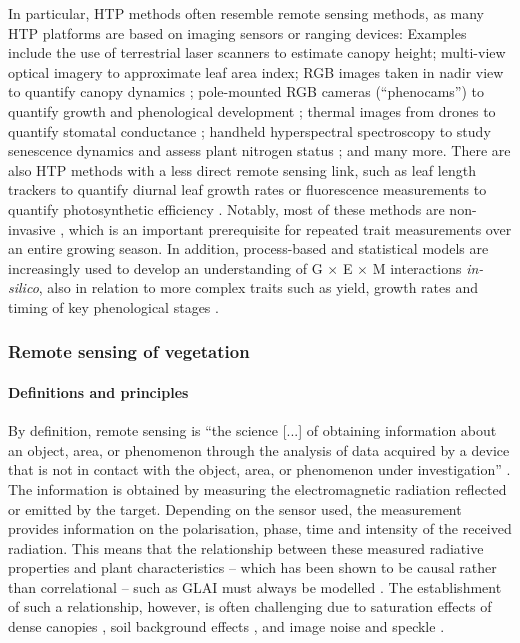 In particular, \gls{HTP} methods often resemble remote sensing methods, as many \gls{HTP} platforms are based on imaging sensors or ranging devices: Examples include the use of terrestrial laser scanners \citep{kronenberg_monitoring_2017} to estimate canopy height; multi-view optical imagery \citep{roth_extracting_2018} to approximate leaf area index; RGB images taken in nadir view to quantify canopy dynamics \citep{yu_image_2017}; pole-mounted RGB cameras (``phenocams'') to quantify growth and phenological development \citep{aasen_phenocams_2020}; thermal images from drones to quantify stomatal conductance \citep{perich_assessment_2020}; handheld hyperspectral spectroscopy to study senescence dynamics \citep{anderegg_spectral_2020} and assess plant nitrogen status \citep{perich_crop_2021}; and many more. There are also \gls{HTP} methods with a less direct remote sensing link, such as leaf length trackers to quantify diurnal leaf growth rates \citep{merz_relationship_2022} or fluorescence measurements to quantify photosynthetic efficiency \citep{keller_toward_2022}. Notably, most of these methods are non-invasive \citep{hund_non-invasive_2019}, which is an important prerequisite for repeated trait measurements over an entire growing season. In addition, process-based and statistical models are increasingly used to develop an understanding of G $\times$ E $\times$ M interactions \textsl{in-silico}, also in relation to more complex traits such as yield, growth rates and timing of key phenological stages \citep{martre_model-assisted_2015, roth_phenomics_2021, roth_phenomics_2022}.

\subsubsection{Remote sensing of vegetation}
\label{subsubsec:intor-rs-veg}
\paragraph{Definitions and principles}
By definition, remote sensing is ``the science [...] of obtaining information about an object, area, or phenomenon through the analysis of data acquired by a device that is not in contact with the object, area, or phenomenon under investigation'' \citep[p. 1]{lillesand_remote_2015}. The information is obtained by measuring the electromagnetic radiation reflected or emitted by the target. Depending on the sensor used, the measurement provides information on the polarisation, phase, time and intensity of the received radiation. This means that the relationship between these measured radiative properties and plant characteristics -- which \cite{kattenborn_radiative_2019} has been shown to be causal rather than correlational -- such as \gls{GLAI} must always be modelled \citep{weiss_remote_2020}. The establishment of such a relationship, however, is often challenging due to saturation effects of dense canopies \citep{mutanga_spectral_2023}, soil background effects \citep{qi_modified_1994}, and image noise and speckle \citep{boncelet_image_2009}.

